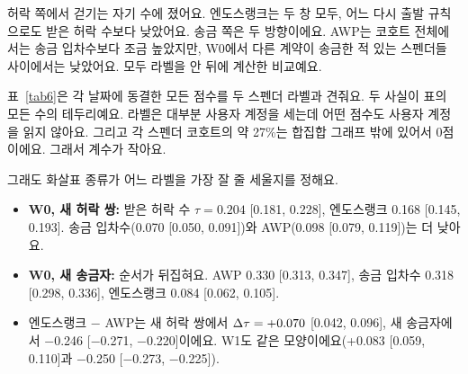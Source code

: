 \begin{yoji}
허락 쪽에서 걷기는 자기 수에 졌어요. 엔도스랭크는 두 창 모두, 어느 다시 출발 규칙으로도 받은 허락 수보다 낮았어요. 송금 쪽은 두 방향이에요. AWP는 코호트 전체에서는 송금 입차수보다 조금 높았지만, W0에서 다른 계약이 송금한 적 있는 스펜더들 사이에서는 낮았어요. 모두 라벨을 안 뒤에 계산한 비교예요.
\end{yoji}

표~\ref{tab6}은 각 날짜에 동결한 모든 점수를 두 스펜더 라벨과 견줘요. 두 사실이 표의 모든 수의 테두리예요. 라벨은 대부분 사용자 계정을 세는데 어떤 점수도 사용자 계정을 읽지 않아요. 그리고 각 스펜더 코호트의 약 27\%는 합집합 그래프 밖에 있어서 0점이에요. 그래서 계수가 작아요.

그래도 화살표 종류가 어느 라벨을 가장 잘 줄 세울지를 정해요.
\begin{itemize}
\item \textbf{W0, 새 허락 쌍:} 받은 허락 수 $\tau=0.204$ [0.181, 0.228], 엔도스랭크 0.168 [0.145, 0.193]. 송금 입차수(0.070 [0.050, 0.091])와 AWP(0.098 [0.079, 0.119])는 더 낮아요.
\item \textbf{W0, 새 송금자:} 순서가 뒤집혀요. AWP 0.330 [0.313, 0.347], 송금 입차수 0.318 [0.298, 0.336], 엔도스랭크 0.084 [0.062, 0.105].
\item 엔도스랭크 − AWP는 새 허락 쌍에서 $\Delta\tau=+0.070$ [0.042, 0.096], 새 송금자에서 −0.246 [−0.271, −0.220]이에요. W1도 같은 모양이에요(+0.083 [0.059, 0.110]과 −0.250 [−0.273, −0.225]).
\end{itemize}

